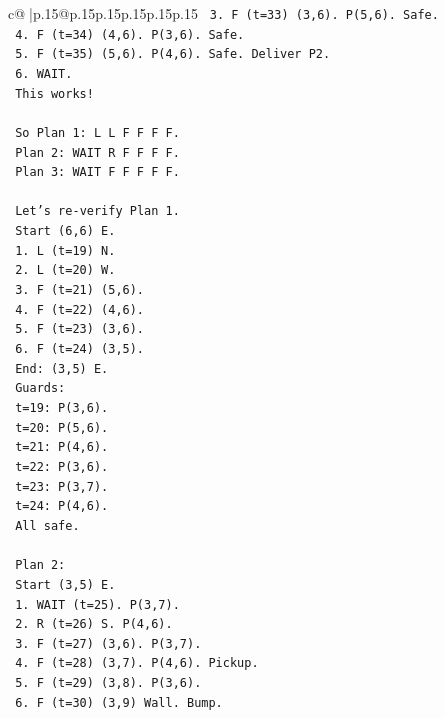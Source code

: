 \documentclass{article}
\begin{document}
{\begin{supertabular}{c@{$\;$}|p{.15\linewidth}@{}p{.15\linewidth}p{.15\linewidth}p{.15\linewidth}p{.15\linewidth}p{.15\linewidth}}
{{{\texttt{   3. F (t=33) (3,6). P(5,6). Safe.} \\
\texttt{   4. F (t=34) (4,6). P(3,6). Safe.} \\
\texttt{   5. F (t=35) (5,6). P(4,6). Safe. Deliver P2.} \\
\texttt{   6. WAIT.} \\
\texttt{   This works!} \\
\\ 
\texttt{   So Plan 1: L L F F F F.} \\
\texttt{   Plan 2: WAIT R F F F F.} \\
\texttt{   Plan 3: WAIT F F F F F.} \\
\\ 
\texttt{   Let's re{-}verify Plan 1.} \\
\texttt{   Start (6,6) E.} \\
\texttt{   1. L (t=19) N.} \\
\texttt{   2. L (t=20) W.} \\
\texttt{   3. F (t=21) (5,6).} \\
\texttt{   4. F (t=22) (4,6).} \\
\texttt{   5. F (t=23) (3,6).} \\
\texttt{   6. F (t=24) (3,5).} \\
\texttt{   End: (3,5) E.} \\
\texttt{   Guards:} \\
\texttt{   t=19: P(3,6).} \\
\texttt{   t=20: P(5,6).} \\
\texttt{   t=21: P(4,6).} \\
\texttt{   t=22: P(3,6).} \\
\texttt{   t=23: P(3,7).} \\
\texttt{   t=24: P(4,6).} \\
\texttt{   All safe.} \\
\\ 
\texttt{   Plan 2:} \\
\texttt{   Start (3,5) E.} \\
\texttt{   1. WAIT (t=25). P(3,7).} \\
\texttt{   2. R (t=26) S. P(4,6).} \\
\texttt{   3. F (t=27) (3,6). P(3,7).} \\
\texttt{   4. F (t=28) (3,7). P(4,6). Pickup.} \\
\texttt{   5. F (t=29) (3,8). P(3,6).} \\
\texttt{   6. F (t=30) (3,9) Wall. Bump.} \\
}}}
\end{supertabular}}
\end{document}
